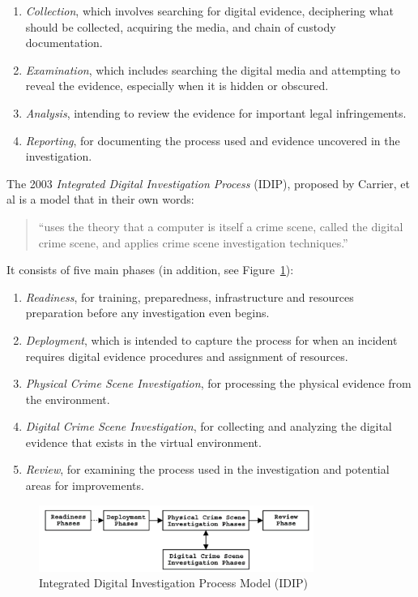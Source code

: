 \documentclass[12pt]{article}
\begin{document}
\begin{enumerate}
  \item {\em Collection}, which involves searching for digital evidence,
  deciphering what should be collected, acquiring the media,
  and chain of custody documentation.
  \item {\em Examination}, which includes searching the digital media
  and attempting to reveal the evidence, especially when it is
  hidden or obscured.
  \item {\em Analysis}, intending to review the evidence for important
  legal infringements. 
  \item {\em Reporting}, for documenting the process used and evidence
  uncovered in the investigation.
\end{enumerate}

The 2003 {\em Integrated Digital Investigation Process} (IDIP)\cite{carrier2003getting},
proposed by Carrier, et al is a model that in their own words:
\begin{quote}
``uses the theory
that a computer is itself a crime scene, called the digital crime scene, and applies crime scene
investigation techniques.''
\end{quote}
It consists of five main phases (in addition, see Figure~\ref{fig:IDIP}):

\begin{enumerate}
  \item {\em Readiness}, for training, preparedness, infrastructure and resources
  preparation before any investigation even begins.
  \item {\em Deployment}, which is intended to capture the process for when an 
  incident requires digital evidence procedures and assignment of resources.
  \item {\em Physical Crime Scene Investigation}, for processing the physical
  evidence from the environment.
  \item {\em Digital Crime Scene Investigation}, for collecting and
  analyzing the digital evidence that exists in the virtual environment.
  \item {\em Review}, for examining the process used in the investigation and
  potential areas for improvements. 
\end{enumerate}

\begin{figure}[ht]
  \centering
    \includegraphics[width=0.8\textwidth]{images/IDIP.png}
  \caption{Integrated Digital Investigation Process Model (IDIP)}
  \label{fig:IDIP}
\end{figure}
\end{document}
